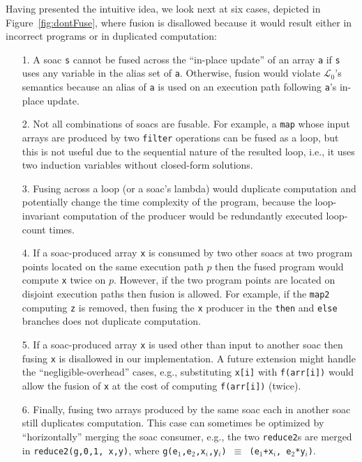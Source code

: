 \documentclass{sigplanconf}  %
\newcommand{\LO}{$\mathcal{L}_0$}
\begin{document}
Having presented the intuitive idea, we look next at six cases,
depicted in Figure~\ref{fig:dontFuse}, where fusion is disallowed because
it would result either in incorrect programs or in duplicated computation:
\begin{itemize}
    \item [1.] A {\sc soac} {\tt s} cannot be fused across the 
                ``in-place update'' of an array {\tt a} if {\tt s} uses any 
                variable in the alias set of {\tt a}.  Otherwise, fusion would
                violate \LO's semantics because an alias of {\tt a} is used on 
                an execution path following {\tt a}'s in-place update.
    \item [2.] Not all combinations of {\sc soac}s are fusable. For example,
                a {\tt map} whose input arrays are produced by two {\tt filter} 
                operations can be fused as a loop, but this is not useful
                due to the sequential nature of the resulted loop, i.e., it 
                uses two induction variables without closed-form solutions.
    \item [3.] Fusing across a loop (or a {\sc soac}'s lambda) would 
                duplicate computation and potentially change the  
                time complexity of the program, because the loop-invariant
                computation of the producer would be redundantly executed 
                loop-count times. 
    \item [4.] If a {\sc soac}-produced array {\tt x} is consumed by two other
                {\sc soac}s at two program points located on the same execution 
                path $p$ then the fused program would compute {\tt x} twice on $p$. 
                However, if the two program points are located on disjoint execution 
                paths then fusion is allowed. For example, if the {\tt map2} computing 
                {\tt z} is removed, then fusing the {\tt x} producer in the 
                {\tt then} and {\tt else} branches does not duplicate computation.
    \item [5.] If a {\sc soac}-produced array {\tt x} is used other than input to   
                another {\sc soac} then fusing {\tt x} is disallowed in our 
                implementation.   A future extension might handle the ``negligible-overhead'' 
                cases, e.g., substituting {\tt x[i]} with {\tt f(arr[i])} 
                would allow the fusion of {\tt x} at the cost of computing {\tt f(arr[i])} (twice).
    \item [6.] Finally, fusing two arrays produced by the same {\sc soac} each in another
                {\sc soac} still duplicates computation. This case can sometimes
                be optimized by ``horizontally'' merging the {\sc soac} consumer,
                e.g., the two {\tt reduce2}s are merged in {\tt reduce2(g,0,1, x,y)},
                where {\tt g(e$_1$,e$_2$,x$_i$,y$_i$)~$\equiv$~(e$_1$+x$_i$, e$_2$*y$_i$)}.
\end{itemize}
\end{document}
